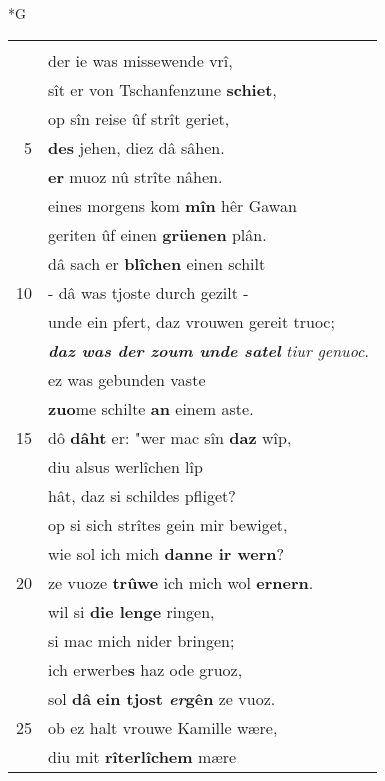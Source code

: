 \documentclass[8pt,a4paper,notitlepage]{article}
\begin{document}
\newpage
\begin{table}[ht]
\begin{minipage}[t]{0.5\linewidth}
\small
\begin{center}*G
\end{center}
\begin{tabular}{rl}
 & \textit{\begin{large}W\end{large}}iez Gawane komen sî,\\ 
 & der ie was missewende vrî,\\ 
 & sît er von Tschanfenzune \textbf{schiet},\\ 
 & op sîn reise ûf strît geriet,\\ 
5 & \textbf{des} jehen, diez dâ sâhen.\\ 
 & \textbf{er} muoz nû strîte nâhen.\\ 
 & eines morgens kom \textbf{mîn} hêr Gawan\\ 
 & geriten ûf einen \textbf{grüenen} plân.\\ 
 & dâ sach er \textbf{blîchen} einen schilt\\ 
10 & - dâ was tjoste durch gezilt -\\ 
 & unde ein pfert, daz vrouwen gereit truoc;\\ 
 & \textit{\textbf{daz was der zoum unde satel}} \textit{tiur genuoc}.\\ 
 & ez was gebunden vaste\\ 
 & \textbf{zuo}me schilte \textbf{an} einem aste.\\ 
15 & dô \textbf{dâht} er: "wer mac sîn \textbf{daz} wîp,\\ 
 & diu alsus werlîchen lîp\\ 
 & hât, daz si schildes pfliget?\\ 
 & op si sich strîtes gein mir bewiget,\\ 
 & wie sol ich mich \textbf{danne ir wern}?\\ 
20 & ze vuoze \textbf{trûwe} ich mich wol \textbf{ernern}.\\ 
 & wil si \textbf{die lenge} ringen,\\ 
 & si mac mich nider bringen;\\ 
 & ich erwerbe\textbf{s} haz ode gruoz,\\ 
 & sol \textbf{dâ} \textbf{ein tjost \textit{er}gên} ze vuoz.\\ 
25 & ob ez halt vrouwe Kamille wære,\\ 
 & diu mit \textbf{rîterlîchem} mære\\ 

\end{tabular}
\end{minipage}
\end{table}
\end{document}
